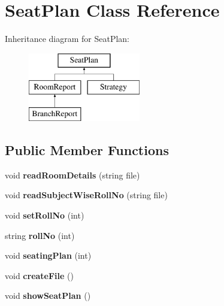 \hypertarget{classSeatPlan}{\section{Seat\-Plan Class Reference}
\label{classSeatPlan}
}
Inheritance diagram for Seat\-Plan\-:\begin{figure}[H]
\begin{center}
\leavevmode
\includegraphics[height=3.000000cm]{classSeatPlan}
\end{center}
\end{figure}
\subsection*{Public Member Functions}
\begin{DoxyCompactItemize}
\item 
\hypertarget{classSeatPlan_af0b793e791818a925f5165eae35085aa}{void {\bfseries read\-Room\-Details} (string file)}\label{classSeatPlan_af0b793e791818a925f5165eae35085aa}

\item 
\hypertarget{classSeatPlan_ada3dbbc8860edafce4b2ba96b1862d67}{void {\bfseries read\-Subject\-Wise\-Roll\-No} (string file)}\label{classSeatPlan_ada3dbbc8860edafce4b2ba96b1862d67}

\item 
\hypertarget{classSeatPlan_a285b0e3a3334b230f26f05cf98979d81}{void {\bfseries set\-Roll\-No} (int)}\label{classSeatPlan_a285b0e3a3334b230f26f05cf98979d81}

\item 
\hypertarget{classSeatPlan_a954020587c5c7d09b00d8129e37015e3}{string {\bfseries roll\-No} (int)}\label{classSeatPlan_a954020587c5c7d09b00d8129e37015e3}

\item 
\hypertarget{classSeatPlan_a68510ad9fdc8570cc80a69b51a8c5973}{void {\bfseries seating\-Plan} (int)}\label{classSeatPlan_a68510ad9fdc8570cc80a69b51a8c5973}

\item 
\hypertarget{classSeatPlan_ab2723653cf69967b512cbf9f996eb1ea}{void {\bfseries create\-File} ()}\label{classSeatPlan_ab2723653cf69967b512cbf9f996eb1ea}

\item 
\hypertarget{classSeatPlan_a6b237e82222d333c0ddf43a9e86a2136}{void {\bfseries show\-Seat\-Plan} ()}\label{classSeatPlan_a6b237e82222d333c0ddf43a9e86a2136}

\end{DoxyCompactItemize}

